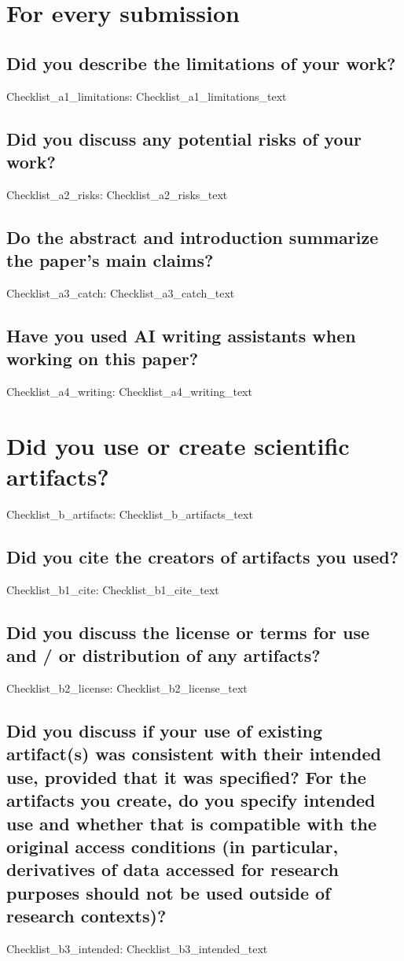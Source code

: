 \documentclass[11pt]{article}
\begin{document}
\appendix

\section{For every submission}
\subsection{Did you describe the limitations of your work?}
{{Checklist_a1_limitations}}: {{Checklist_a1_limitations_text}}
\subsection{Did you discuss any potential risks of your work?}
{{Checklist_a2_risks}}: {{Checklist_a2_risks_text}}
\subsection{Do the abstract and introduction summarize the paper’s main claims?}
{{Checklist_a3_catch}}: {{Checklist_a3_catch_text}}
\subsection{Have you used AI writing assistants when working on this paper?}
{{Checklist_a4_writing}}: {{Checklist_a4_writing_text}}

\section{Did you use or create scientific artifacts?}
{{Checklist_b_artifacts}}: {{Checklist_b_artifacts_text}}
\subsection{Did you cite the creators of artifacts you used?}
{{Checklist_b1_cite}}: {{Checklist_b1_cite_text}}
\subsection{Did you discuss the license or terms for use and / or distribution of any artifacts?}
{{Checklist_b2_license}}: {{Checklist_b2_license_text}}
\subsection{Did you discuss if your use of existing artifact(s) was consistent with their intended use, provided that it was specified? For the artifacts you create, do you specify intended use and whether that is compatible with the original access conditions (in particular, derivatives of data accessed for research purposes should not be used outside of research contexts)?}
{{Checklist_b3_intended}}: {{Checklist_b3_intended_text}}
\end{document}
